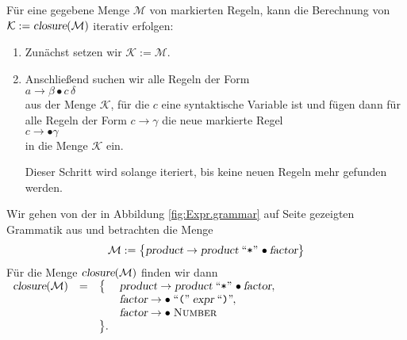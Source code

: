 \noindent
F\"ur eine gegebene Menge $\mathcal{M}$ von markierten Regeln, kann die Berechnung von
$\mathcal{K} := \textsl{closure}(\mathcal{M})$ iterativ erfolgen:
\begin{enumerate}
\item Zun\"achst setzen wir $\mathcal{K} := \mathcal{M}$.
\item Anschlie{\ss}end suchen wir alle Regeln der Form
      \\[0.2cm]
      \hspace*{1.3cm}
      $a \rightarrow \beta \bullet c\, \delta$
      \\[0.2cm]
      aus der Menge $\mathcal{K}$, f\"ur die $c$ eine syntaktische Variable ist und f\"ugen dann
      f\"ur alle Regeln der Form $c \rightarrow \gamma$ die neue markierte Regel
      \\[0.2cm]
      \hspace*{1.3cm}
      $c \rightarrow \bullet\gamma$
      \\[0.2cm]
      in die Menge $\mathcal{K}$ ein.

      Dieser Schritt wird solange iteriert, bis keine neuen Regeln mehr gefunden werden.
\end{enumerate}
\pagebreak

\example
Wir gehen von der in Abbildung
\ref{fig:Expr.grammar} auf Seite \pageref{fig:Expr.grammar} gezeigten Grammatik aus und betrachten
die Menge
\[ \mathcal{M} := 
   \bigl\{ \textsl{product} \rightarrow \textsl{product} \;\mbox{``\texttt{*}''}\;\! \bullet \textsl{factor} \bigr\}
\]
F\"ur die Menge $\textsl{closure}(\mathcal{M})$ finden wir dann
\\[0.2cm]
\hspace*{1.3cm}
$ 
\begin{array}[b]{lcll}
\textsl{closure}(\mathcal{M}) 
 & = & \bigl\{ &
         \textsl{product} \rightarrow \textsl{product} \quoted{*}\! \bullet \textsl{factor}, \\
   & & & \textsl{factor}  \rightarrow \bullet \quoted{(} \textsl{expr} \quoted{)}\!\!,          \\
   & & & \textsl{factor}  \rightarrow \bullet \;\textsc{Number}                                  \\
   & & \bigr\}. & \hspace*{8cm} 
\end{array}$  \eox
\vspace*{0.3cm}


